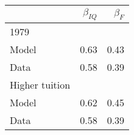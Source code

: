 \begin{tabular}{lrr}
\hline
  & $\beta_{IQ}$  & $\beta_{F}$  \\ 
\hline
1979 &   &   \\ 
Model & 0.63  & 0.43  \\ 
Data & 0.58  & 0.39  \\ 
Higher tuition &   &   \\ 
Model & 0.62  & 0.45  \\ 
Data & 0.58  & 0.39  \\ 
\hline
\end{tabular}%
